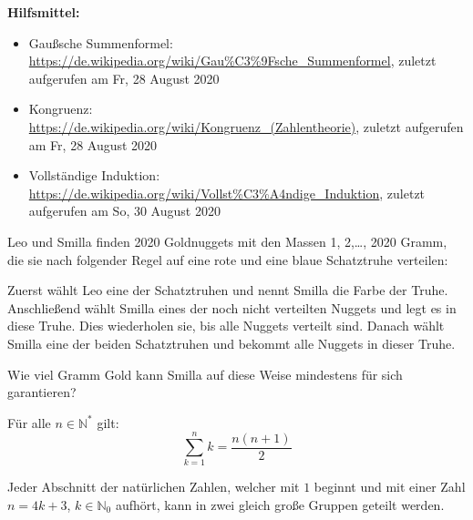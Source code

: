 \documentclass[10pt, a4paper, reqno]{amsart}
\begin{document}
\thispagestyle{Hilfsmittel}
\vspace*{3pt}
\begin{center}
  \large\textbf{Hilfsmittel:}
\end{center}
\vspace*{3pt}
\begin{itemize}
\item Gaußsche Summenformel:\\
  \url{https://de.wikipedia.org/wiki/Gau%C3%9Fsche_Summenformel}, zuletzt
  aufgerufen am Fr, 28 August 2020
\item Kongruenz:\\
  \url{https://de.wikipedia.org/wiki/Kongruenz_(Zahlentheorie)}, zuletzt
  aufgerufen am Fr, 28 August 2020
\item Vollständige Induktion:\\
  \url{https://de.wikipedia.org/wiki/Vollst%C3%A4ndige_Induktion}, zuletzt
  aufgerufen am So, 30 August 2020
\end{itemize}
\newpage
\pagestyle{normal}
\begin{aufgabe}
  Leo und Smilla finden 2020 Goldnuggets mit den Massen 1, 2,\ldots, 2020 Gramm,
  die sie nach folgender Regel auf eine rote und eine blaue Schatztruhe
  verteilen:
 
  Zuerst wählt Leo eine der Schatztruhen und nennt Smilla die Farbe der Truhe.
  Anschließend wählt Smilla eines der noch nicht verteilten Nuggets und legt es
  in diese Truhe. Dies wiederholen sie, bis alle Nuggets verteilt sind. Danach
  wählt Smilla eine der beiden Schatztruhen und bekommt alle Nuggets in dieser
  Truhe.

  Wie viel Gramm Gold kann Smilla auf diese Weise mindestens für sich
  garantieren?
\end{aufgabe}
\begin{lemma}\label{sec1:Zahlensumme}
  Für alle $n∈ℕ^*$ gilt:
  \[ \sum^{n}_{k=1}k=\frac{n(n+1)}{2}\]
\end{lemma}
\begin{lemma}
  \label{sec1:zahlengruppen}
  Jeder Abschnitt der natürlichen Zahlen, welcher mit $1$ beginnt und mit einer
  Zahl $n=4k+3$, $k∈ℕ_0$ aufhört, kann in zwei gleich große Gruppen geteilt
  werden.
\end{lemma}
\end{document}
